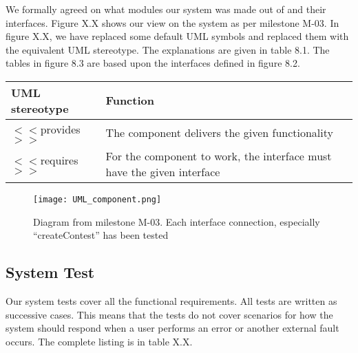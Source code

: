 We formally agreed on what modules our system was made out of and their
interfaces. Figure X.X shows our view on the system as per milestone
M-03. In figure X.X, we have replaced some default UML symbols and
replaced them with the equivalent UML stereotype. The explanations are
given in table 8.1. The tables in figure 8.3 are based upon the
interfaces defined in figure 8.2. 

\begin{tabular}{|l|l|}
    \hline
    \textbf{UML stereotype} & \textbf{Function}\\
    \hline

    $<<$provides$>>$ & The component delivers the given functionality \\
    \hline

    $<<$requires$>>$& For the component to work, the interface must have the given interface\\
        \hline
    \end{tabular}

    \begin{figure}[h!]
        \texttt{[image: UML\_component.png]}
        \caption{Diagram from milestone M-03. Each interface connection, especially
        ``createContest'' has been tested}
\end{figure}

\subsection{System Test}
Our system tests cover all the functional requirements. All tests are
written as successive cases. This means that the tests do not cover
scenarios for how the system should respond when a user performs an
error or another external fault occurs. The complete listing is in
table X.X.

